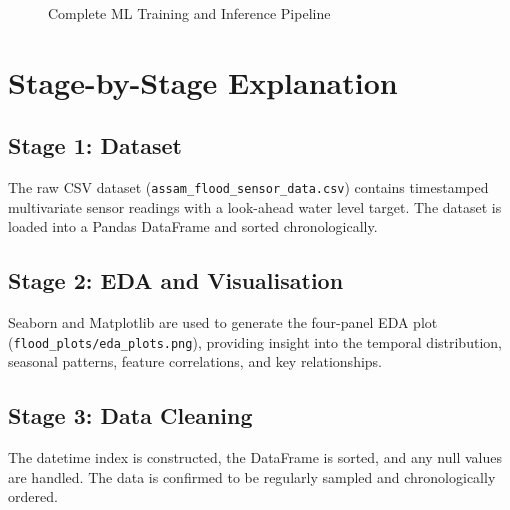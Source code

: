 \begin{figure}[htbp]
{%
}
\caption{Complete ML Training and Inference Pipeline}
\label{fig:ml_pipeline}
\end{figure}

\section{Stage-by-Stage Explanation}

\subsection{Stage 1: Dataset}
The raw CSV dataset (\texttt{assam\_\allowbreak{}flood\_\allowbreak{}sensor\_\allowbreak{}data.\allowbreak{}csv}) contains timestamped multivariate sensor readings with a look-ahead water level target. The dataset is loaded into a Pandas DataFrame and sorted chronologically.

\subsection{Stage 2: EDA and Visualisation}
Seaborn and Matplotlib are used to generate the four-panel EDA plot (\texttt{flood\_\allowbreak{}plots/\allowbreak{}eda\_\allowbreak{}plots.\allowbreak{}png}), providing insight into the temporal distribution, seasonal patterns, feature correlations, and key relationships.

\subsection{Stage 3: Data Cleaning}
The datetime index is constructed, the DataFrame is sorted, and any null values are handled. The data is confirmed to be regularly sampled and chronologically ordered.

